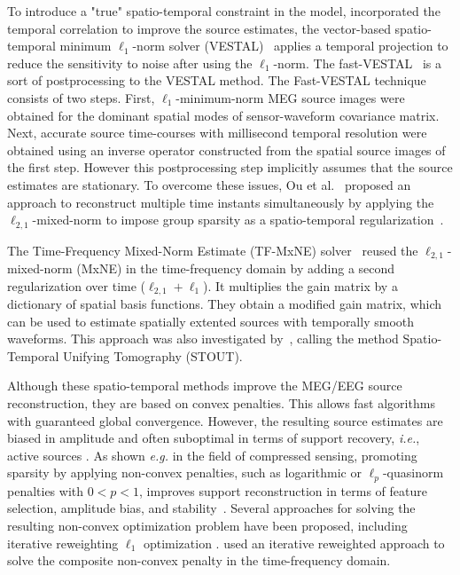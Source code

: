 To introduce a "true" spatio-temporal constraint in the model, \cite{zhang2011sparse,zhang2011iterative} incorporated the temporal correlation to improve the source estimates, the vector-based spatio-temporal minimum $\ell_1$-norm solver (VESTAL)~\cite{huang2006vector} applies a temporal projection to reduce the sensitivity to noise after using the $\ell_1$-norm. The fast-VESTAL~\cite{huang2014meg} is a sort of postprocessing to the VESTAL method. The Fast-VESTAL technique consists of two steps. First, $\ell_1$-minimum-norm MEG source images were obtained for the dominant spatial modes of sensor-waveform covariance matrix. Next, accurate source time-courses with millisecond temporal resolution were obtained using an inverse operator constructed from the spatial source images of the first step. However this postprocessing step implicitly assumes that the source estimates are stationary. To overcome these issues, Ou et al.~\cite{Ou-etal:2009} proposed an approach to reconstruct multiple time instants simultaneously by applying the $\ell_{2,1}$-mixed-norm to impose group sparsity as a spatio-temporal regularization~\cite{gramfort2012mixed,Ou-etal:2009}.

The Time-Frequency Mixed-Norm Estimate (TF-MxNE) solver~\cite{TF-MxNE} reused the $\ell_{2,1}$-mixed-norm (MxNE) in the time-frequency domain by adding a second regularization over time ($\ell_{2,1} + \ell_1$). It multiplies the gain matrix by a dictionary of spatial basis functions. They obtain a modified gain matrix, which can be used to estimate spatially extented sources with temporally smooth waveforms. This approach was also investigated by~\cite{castano2015solving}, calling the method Spatio-Temporal Unifying Tomography (STOUT).

Although these spatio-temporal methods improve the MEG/EEG source reconstruction, they are based on convex penalties. This allows fast algorithms with guaranteed global convergence. However, the resulting source estimates are biased in amplitude and often suboptimal in terms of support recovery, \textit{i.e.}, active sources \cite{candes2008enhancing}. As shown \textit{e.g.} in the field of compressed sensing, promoting sparsity by applying non-convex penalties, such as logarithmic or  $\ell_p$-quasinorm penalties with $0<p<1$, improves support reconstruction in terms of feature selection, amplitude bias, and stability~\cite{candes2008enhancing,chartrand2007exact,saab2008stable}. Several approaches for solving the resulting non-convex optimization problem have been proposed, including iterative reweighting $\ell_1$ optimization \cite{candes2008enhancing}. \cite{strohmeier2014iterative} used an iterative reweighted approach to solve the composite non-convex penalty in the time-frequency domain.

